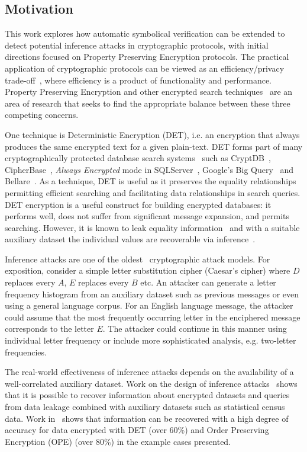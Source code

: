 \documentclass[runningheads]{llncs}
\begin{document}
\subsection{Motivation}
This work explores how automatic symbolical verification can be extended to detect potential inference attacks in cryptographic protocols, with initial directions focused on Property Preserving Encryption protocols.
The practical application of cryptographic protocols can be viewed as an efficiency/privacy trade-off~\cite{GenericAttacks}, where efficiency is a product of functionality and performance. Property Preserving Encryption and other encrypted search techniques~\cite{SOK2017} are an area of research that seeks to find the appropriate balance between these three competing concerns.   

One technique is Deterministic Encryption (DET), i.e. an encryption that always produces the same encrypted text for a given plain-text. DET forms part of many cryptographically protected database search systems~\cite{SOK2017} such as CryptDB~\cite{Popa2011}, CipherBase~\cite{cipherbase}, \textit{Always Encrypted} mode in SQLServer~\cite{AlwaysEncrypted}, Google's Big Query~\cite{Schindler2016} and Bellare~\cite{Bellare2007}. As a technique, DET is useful as it preserves the equality relationships permitting efficient searching and facilitating data relationships in search queries. DET encryption is a useful construct for building encrypted databases: it performs well, does not suffer from significant message expansion, and permits searching. However, it is known to leak equality information~\cite{SOK2017} and with a suitable auxiliary dataset the individual values are recoverable via inference~\cite{InfrenceAttacks}. 

Inference attacks are one of the oldest~\cite{Arab} cryptographic attack models. For exposition, consider a simple letter substitution cipher (Caesar's cipher) where $D$ replaces every $A$, $E$ replaces every $B$ etc. An attacker can generate a letter frequency histogram from an auxiliary dataset such as previous messages or even using a general language corpus. For an English language message, the attacker could assume that the most frequently occurring letter in the enciphered message corresponds to the letter $E$. The attacker could continue in this manner using individual letter frequency or include more sophisticated analysis, e.g. two-letter frequencies.

The real-world effectiveness of inference attacks depends on the availability of a well-correlated auxiliary dataset. Work on the design of inference attacks~\cite{Ismal2012} shows that it is possible to recover information about encrypted datasets and queries from data leakage combined with auxiliary datasets such as statistical census data. Work in~\cite{InfrenceAttacks} shows that information can be recovered with a high degree of accuracy for data encrypted with DET (over 60\%) and Order Preserving Encryption (OPE) (over 80\%) in the example cases presented.
\end{document}

